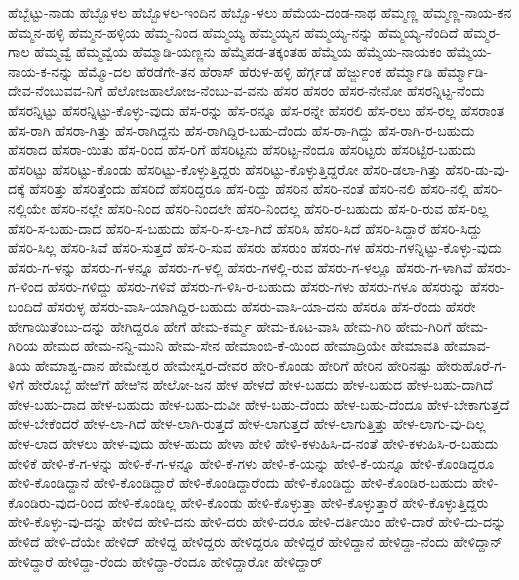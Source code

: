 ಹೆಬ್ಬೆಟ್ಟು-ನಾಡು
ಹೆಬ್ಬೊಳಲ
ಹೆಬ್ಬೊಳಲ-ಇಂದಿನ
ಹೆಬ್ಬೊ-ಳಲು
ಹೆಮೆಯ-ದಂಡ-ನಾಥ
ಹೆಮ್ಮಣ್ಣ
ಹೆಮ್ಮಣ್ಣ-ನಾಯ-ಕನ
ಹೆಮ್ಮನ-ಹಳ್ಳಿ
ಹೆಮ್ಮನ-ಹಳ್ಳಿಯ
ಹೆಮ್ಮ-ನಿಂದ
ಹೆಮ್ಮಯ್ಯ
ಹೆಮ್ಮಯ್ಯನ
ಹೆಮ್ಮಯ್ಯ-ನನ್ನು
ಹೆಮ್ಮಯ್ಯ-ನೆಂದಿದೆ
ಹೆಮ್ಮರ-ಗಾಲ
ಹೆಮ್ಮವ್ವೆ
ಹೆಮ್ಮವ್ವೆಯ
ಹೆಮ್ಮಾಡಿ-ಯಣ್ಣನು
ಹೆಮ್ಮೆಪಡ-ತಕ್ಕಂತಹ
ಹೆಮ್ಮೆಯ
ಹೆಮ್ಮೆಯ-ನಾಯಕಂ
ಹೆಮ್ಮೆಯ-ನಾಯ-ಕ-ನನ್ನು
ಹೆಮ್ಮೊ-ದಲ
ಹೆರಡೆಗೇ-ತನ
ಹೆರಾಸ್
ಹೆರುಳ-ಹಳ್ಳಿ
ಹೆರ್ಗ್ಗಡೆ
ಹೆರ್ಜ್ಜುಂಕ
ಹೆರ್ಮ್ಮಾಡಿ
ಹೆರ್ಮ್ಮಾಡಿ-ದೇವ-ನೆಂಬುವವ-ನಿಗೆ
ಹೆಲೋಜಹಾಲೋಜ-ನೆಂಬು-ವ-ವನು
ಹೆಸರ
ಹೆಸರಂ
ಹೆಸರ-ನೇನೋ
ಹೆಸರನ್ನಿಟ್ಟ-ನೆಂದು
ಹೆಸರನ್ನಿಟ್ಟು
ಹೆಸರನ್ನಿಟ್ಟು-ಕೊಳ್ಳು-ವುದು
ಹೆಸ-ರನ್ನು
ಹೆಸ-ರನ್ನೂ
ಹೆಸ-ರನ್ನೇ
ಹೆಸರಲಿ
ಹೆಸ-ರಲು
ಹೆಸ-ರಲ್ಲ
ಹೆಸರಾಂತ
ಹೆಸ-ರಾಗಿ
ಹೆಸರಾ-ಗಿತ್ತು
ಹೆಸ-ರಾಗಿದ್ದನು
ಹೆಸ-ರಾಗಿದ್ದಿರ-ಬಹು-ದೆಂದು
ಹೆಸ-ರಾ-ಗಿದ್ದು
ಹೆಸ-ರಾಗಿ-ರ-ಬಹುದು
ಹೆಸರಾದ
ಹೆಸರಾ-ಯಿತು
ಹೆಸ-ರಿಂದ
ಹೆಸ-ರಿಗೆ
ಹೆಸರಿಟ್ಟನು
ಹೆಸರಿಟ್ಟ-ನೆಂದೂ
ಹೆಸರಿಟ್ಟರು
ಹೆಸರಿಟ್ಟಿರ-ಬಹುದು
ಹೆಸರಿಟ್ಟು
ಹೆಸರಿಟ್ಟು-ಕೊಂಡು
ಹೆಸರಿಟ್ಟು-ಕೊಳ್ಳುತ್ತಿದ್ದರು
ಹೆಸರಿಟ್ಟು-ಕೊಳ್ಳುತ್ತಿದ್ದರೋ
ಹೆಸರಿ-ಡಲಾ-ಗಿತ್ತು
ಹೆಸರಿ-ಡು-ವು-ದಕ್ಕೆ
ಹೆಸರಿತ್ತು
ಹೆಸರಿತ್ತೆಂದು
ಹೆಸರಿದೆ
ಹೆಸರಿದ್ದರೂ
ಹೆಸ-ರಿದ್ದು
ಹೆಸರಿನ
ಹೆಸರಿ-ನಂತೆ
ಹೆಸರಿ-ನಲಿ
ಹೆಸರಿ-ನಲ್ಲಿ
ಹೆಸರಿ-ನಲ್ಲಿಯೇ
ಹೆಸರಿ-ನಲ್ಲೇ
ಹೆಸರಿ-ನಿಂದ
ಹೆಸರಿ-ನಿಂದಲೇ
ಹೆಸರಿ-ನಿಂದಲ್ಲ
ಹೆಸರಿ-ರ-ಬಹುದು
ಹೆಸ-ರಿ-ರುವ
ಹೆಸ-ರಿಲ್ಲ
ಹೆಸರಿ-ಸ-ಬಹು-ದಾದ
ಹೆಸರಿ-ಸ-ಬಹುದು
ಹೆಸ-ರಿ-ಸ-ಲಾ-ಗಿದೆ
ಹೆಸರಿಸಿ
ಹೆಸರಿ-ಸಿದೆ
ಹೆಸರಿ-ಸಿದ್ದಾರೆ
ಹೆಸರಿ-ಸಿದ್ದು
ಹೆಸರಿ-ಸಿಲ್ಲ
ಹೆಸರಿ-ಸಿವೆ
ಹೆಸರಿ-ಸುತ್ತದೆ
ಹೆಸ-ರಿ-ಸುವ
ಹೆಸರು
ಹೆಸರುಂ
ಹೆಸರು-ಗಳ
ಹೆಸರು-ಗಳನ್ನಿಟ್ಟು-ಕೊಳ್ಳು-ವುದು
ಹೆಸರು-ಗ-ಳನ್ನು
ಹೆಸರು-ಗ-ಳನ್ನೂ
ಹೆಸರು-ಗ-ಳಲ್ಲಿ
ಹೆಸರು-ಗಳಲ್ಲಿ-ರುವ
ಹೆಸರು-ಗ-ಳಲ್ಲೂ
ಹೆಸರು-ಗ-ಳಾಗಿವೆ
ಹೆಸರು-ಗ-ಳಿಂದ
ಹೆಸರು-ಗಳಿದ್ದು
ಹೆಸರು-ಗಳಿವೆ
ಹೆಸರು-ಗ-ಳಿಸಿ-ರ-ಬಹುದು
ಹೆಸರು-ಗಳು
ಹೆಸರು-ಗಳೂ
ಹೆಸರುನ್ನು
ಹೆಸರು-ಬಂದಿದೆ
ಹೆಸರುಳ್ಳ
ಹೆಸರು-ವಾಸಿ-ಯಾಗಿದ್ದಿರ-ಬಹುದು
ಹೆಸರು-ವಾಸಿ-ಯಾ-ದನು
ಹೆಸರೂ
ಹೆಸ-ರೆಂದು
ಹೆಸರೇ
ಹೇಗಾಯಿತೆಂಬು-ದನ್ನು
ಹೇಗಿದ್ದರೂ
ಹೇಗೆ
ಹೇಮ-ಕರ್ಮ್ಮ
ಹೇಮ-ಕೂಟ-ವಾಸಿ
ಹೇಮ-ಗಿರಿ
ಹೇಮ-ಗಿರಿಗೆ
ಹೇಮ-ಗಿರಿಯ
ಹೇಮದ
ಹೇಮ-ನನ್ದಿ-ಮುನಿ
ಹೇಮ-ಸೇನ
ಹೇಮಾಂಬಿ-ಕೆ-ಯಿಂದ
ಹೇಮಾದ್ರಿಯೇ
ಹೇಮಾವತಿ
ಹೇಮಾವ-ತಿಯ
ಹೇಮಾಶ್ವ-ದಾನ
ಹೇಮೇಶ್ವರ
ಹೇಮೇಸ್ವರ-ದೇವರ
ಹೇರಿ-ಕೊಂಡು
ಹೇರಿಗೆ
ಹೇರಿನ
ಹೇರಿನಷ್ಟು
ಹೇರುಹೊರೆ-ಗ-ಳಿಗೆ
ಹೇರೊಬ್ಬೆ
ಹೇಱಿಗೆ
ಹೇಱಿನ
ಹೇಲೋ-ಜನ
ಹೇಳ
ಹೇಳದೆ
ಹೇಳ-ಬಹದು
ಹೇಳ-ಬಹುದ
ಹೇಳ-ಬಹು-ದಾಗಿದೆ
ಹೇಳ-ಬಹು-ದಾದ
ಹೇಳ-ಬಹುದು
ಹೇಳ-ಬಹು-ದುವೀ
ಹೇಳ-ಬಹು-ದೆಂದು
ಹೇಳ-ಬಹು-ದೆಂದೂ
ಹೇಳ-ಬೇಕಾಗುತ್ತದೆ
ಹೇಳ-ಬೇಕೆಂದರೆ
ಹೇಳ-ಲಾ-ಗಿದೆ
ಹೇಳ-ಲಾಗಿ-ರುತ್ತದೆ
ಹೇಳ-ಲಾಗುತ್ತದೆ
ಹೇಳ-ಲಾಗುತ್ತಿತ್ತು
ಹೇಳ-ಲಾಗು-ವು-ದಿಲ್ಲ
ಹೇಳ-ಲಾದ
ಹೇಳಲು
ಹೇಳ-ವುದು
ಹೇಳ-ಹುದು
ಹೇಳಾ
ಹೇಳಿ
ಹೇಳಿ-ಕಳುಹಿಸಿ-ದ-ನಂತೆ
ಹೇಳಿ-ಕಳುಹಿಸಿ-ರ-ಬಹುದು
ಹೇಳಿಕೆ
ಹೇಳಿ-ಕೆ-ಗ-ಳನ್ನು
ಹೇಳಿ-ಕೆ-ಗ-ಳನ್ನೂ
ಹೇಳಿ-ಕೆ-ಗಳು
ಹೇಳಿ-ಕೆ-ಯನ್ನು
ಹೇಳಿ-ಕೆ-ಯನ್ನೂ
ಹೇಳಿ-ಕೊಂಡಿದ್ದರೂ
ಹೇಳಿ-ಕೊಂಡಿದ್ದಾನೆ
ಹೇಳಿ-ಕೊಂಡಿದ್ದಾರೆ
ಹೇಳಿ-ಕೊಂಡಿದ್ದಾರೆಂದು
ಹೇಳಿ-ಕೊಂಡಿದ್ದು
ಹೇಳಿ-ಕೊಂಡಿರ-ಬಹುದು
ಹೇಳಿ-ಕೊಂಡಿರು-ವುದ-ರಿಂದ
ಹೇಳಿ-ಕೊಂಡಿಲ್ಲ
ಹೇಳಿ-ಕೊಂಡು
ಹೇಳಿ-ಕೊಳ್ಳುತ್ತಾ
ಹೇಳಿ-ಕೊಳ್ಳುತ್ತಾರೆ
ಹೇಳಿ-ಕೊಳ್ಳುತ್ತಿದ್ದರು
ಹೇಳಿ-ಕೊಳ್ಳು-ವು-ದನ್ನು
ಹೇಳಿದ
ಹೇಳಿ-ದನು
ಹೇಳಿ-ದರು
ಹೇಳಿ-ದರೂ
ಹೇಳಿ-ದರ್ತಿಯಿಂ
ಹೇಳಿ-ದಾರೆ
ಹೇಳಿ-ದು-ದನ್ನು
ಹೇಳಿದೆ
ಹೇಳಿ-ದೆಯೇ
ಹೇಳಿದ್
ಹೇಳಿದ್ದ
ಹೇಳಿದ್ದರು
ಹೇಳಿದ್ದರೂ
ಹೇಳಿದ್ದರೆ
ಹೇಳಿದ್ದಾನೆ
ಹೇಳಿದ್ದಾ-ನೆಂದು
ಹೇಳಿದ್ದಾನ್
ಹೇಳಿದ್ದಾರೆ
ಹೇಳಿದ್ದಾ-ರೆಂದು
ಹೇಳಿದ್ದಾ-ರೆಂದೂ
ಹೇಳಿದ್ದಾರೋ
ಹೇಳಿದ್ದಾರ್
